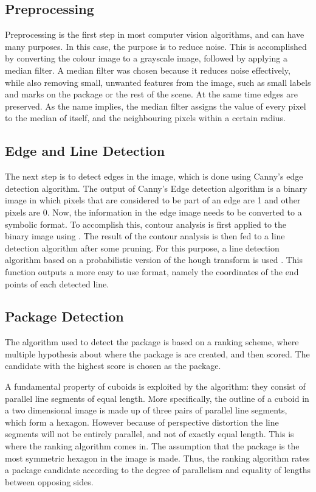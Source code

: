 
\subsection{Preprocessing}

Preprocessing is the first step in most computer vision algorithms, and can have many purposes. 
In this case, the purpose is to reduce noise.
This is accomplished by converting the colour image to a grayscale image, followed by applying a median filter. 
A median filter was chosen because it reduces noise effectively, while also removing small, unwanted features from the image, such as small labels and marks on the package or the rest of the scene.
At the same time edges are preserved.
As the name implies, the median filter assigns the value of every pixel to the median of itself, and the neighbouring pixels within a certain radius.

\subsection{Edge and Line Detection} %
The next step is to detect edges in the image, which is done using Canny's edge detection algorithm\cite{canny}.
The output of Canny's Edge detection algorithm is a binary image in which pixels that are considered to be part of an edge are 1 and other pixels are 0.
Now, the information in the edge image needs to be converted to a symbolic format.
To accomplish this, contour analysis is first applied to the binary image using \cite{suzuki}.
The result of the contour analysis is then fed to a line detection algorithm after some pruning.
For this purpose, a line detection algorithm based on a probabilistic version of the hough transform is used \cite{houghp}.
This function outputs a more easy to use format, namely the coordinates of the end points of each detected line.

\subsection{Package Detection}

The algorithm used to detect the package is based on a ranking scheme, where multiple hypothesis about where the package is are created, and then scored. 
The candidate with the highest score is chosen as the package. 

A fundamental property of cuboids is exploited by the algorithm: they consist of parallel line segments of equal length. 
More specifically, the outline of a cuboid in a two dimensional image is made up of three pairs of parallel line segments, which form a hexagon. 
However because of perspective distortion the line segments will not be entirely parallel, and not  of exactly equal length.
This is where the ranking algorithm comes in.
The assumption that the package is the most symmetric hexagon in the image is made. %
Thus, the ranking algorithm rates a package candidate according to the degree of parallelism and equality of lengths between opposing sides.

